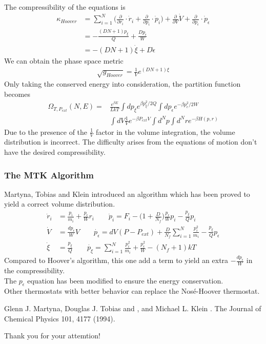 \documentclass{beamer}
\begin{document}
\begin{frame}
\fontsize{9pt}{10pt}\selectfont
The compressibility of the equations is
\begin{align}
\kappa_{Hoover}&=\sum_{i=1}^N\bigg(\frac{\partial}{\partial r_i}\cdot\dot{r}_i+\frac{\partial}{\partial p_i}\cdot\dot{p}_i\bigg)+\frac{\partial}{\partial V}\dot{V}+\frac{\partial}{\partial p_{\epsilon}}\cdot\dot{p}_{\epsilon}\nonumber\\
&=-\frac{(DN+1)p_{\xi}}{Q}+\frac{Dp_{\epsilon}}{W}\\
&=-(DN+1)\dot{\xi}+D\dot{\epsilon}\nonumber
\end{align}
We can obtain the phase space metric 
\begin{align}
\sqrt{g_{Hoover}}=\frac{1}{V}e^{(DN+1)\xi}
\end{align}
Only taking the conserved energy into consideration, the partition function becomes
\begin{align}
\Omega_{T,P_{ext}}(N,E)=&\frac{e^{\beta E}}{LkT}\int dp_{\xi}e^{\beta p_{\xi}^2/2Q}\int dp_{\epsilon}e^{-\beta p_{\epsilon}^2/2W}\nonumber\\
&\int dV\frac{1}{V}e^{-\beta P_{ext}V}\int d^Np\int d^Nre^{-\beta H(p,r)}
\end{align}
Due to the presence of the $\frac{1}{V}$ factor in the volume integration, the volume distribution is incorrect. The difficulty arises from the equations of motion don't have the desired compressibility.
\end{frame}
\begin{frame}
\frametitle{The MTK Algorithm}
\fontsize{9pt}{10pt}\selectfont
Martyna, Tobias and Klein introduced an algorithm which has been proved to yield a correct volume distribution.
\begin{align}
\dot{r}_i&=\frac{p_i}{m_i}+\frac{p_{\epsilon}}{W}r_i\qquad
\dot{p}_i=F_i-\bigg(1+\frac{D}{N_f}\bigg)\frac{p_{\epsilon}}{W}p_i-\frac{p_{\xi}}{Q}p_i\nonumber\\
\dot{V}&=\frac{dp_{\epsilon}}{W}V\qquad
\dot{p_{\epsilon}}=dV(P-P_{ext})+\frac{D}{N_f}\sum_{i=1}^{N}\frac{p_i^2}{m_i}-\frac{p_{\xi}}{Q}p_{\epsilon}\\
\dot{\xi}&=\frac{p_{\xi}}{Q}\qquad
\dot{p_{\xi}}=\sum^N_{i=1}\frac{p_i^2}{m_i}+\frac{p_{\epsilon}^2}{W}-(N_f+1)kT
\end{align}
Compared to Hoover's algorithm, this one add a term to yield an extra $-\frac{dp_\epsilon}{W}$ in the compressibility. \\The $p_\epsilon$ equation has been modified to ensure the energy conservation.\\
Other thermostats with better behavior can replace the Nos\'{e}-Hoover thermostat.
\begin{thebibliography}{2}
\beamertemplatearticlebibitems
{} Glenn J. Martyna, Douglas J. Tobias and , and Michael L. Klein . The Journal of Chemical Physics 101, 4177 (1994).
\end{thebibliography}
\end{frame}
\begin{frame}
\fontsize{20pt}{10pt}\selectfont
Thank you for your attemtion!
\end{frame}
\end{document}
